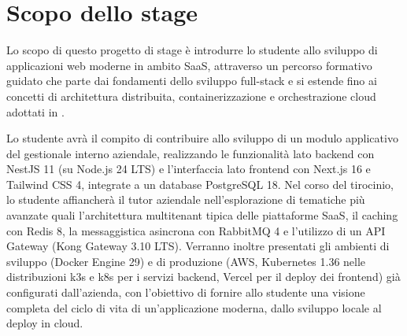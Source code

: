 \section*{Scopo dello stage}
Lo scopo di questo progetto di stage è introdurre lo studente allo sviluppo di applicazioni web moderne in ambito SaaS, attraverso un percorso formativo guidato che parte dai fondamenti dello sviluppo full-stack e si estende fino ai concetti di architettura distribuita, containerizzazione e orchestrazione cloud adottati in \ragioneSocAzienda.

Lo studente avrà il compito di contribuire allo sviluppo di un modulo applicativo del gestionale interno aziendale, realizzando le funzionalità lato backend con NestJS 11 (su Node.js 24 LTS) e l'interfaccia lato frontend con Next.js 16 e Tailwind CSS 4, integrate a un database PostgreSQL 18. Nel corso del tirocinio, lo studente affiancherà il tutor aziendale nell'esplorazione di tematiche più avanzate quali l'architettura multitenant tipica delle piattaforme SaaS, il caching con Redis 8, la messaggistica asincrona con RabbitMQ 4 e l'utilizzo di un API Gateway (Kong Gateway 3.10 LTS). Verranno inoltre presentati gli ambienti di sviluppo (Docker Engine 29) e di produzione (AWS, Kubernetes 1.36 nelle distribuzioni k3s e k8s per i servizi backend, Vercel per il deploy dei frontend) già configurati dall'azienda, con l'obiettivo di fornire allo studente una visione completa del ciclo di vita di un'applicazione moderna, dallo sviluppo locale al deploy in cloud.

